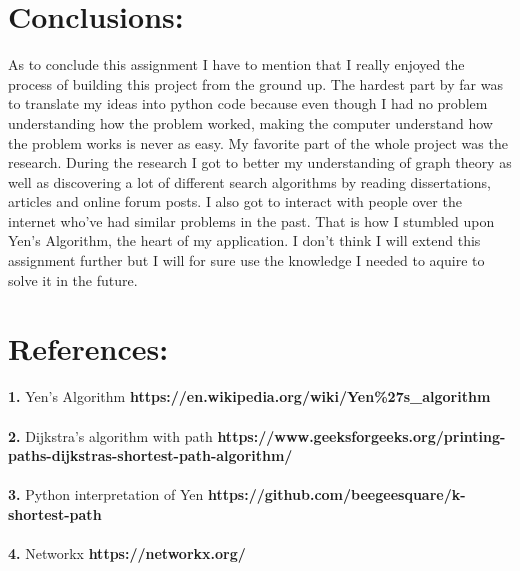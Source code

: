 \documentclass[12pt]{article}
\begin{document}
\section{Conclusions:}
As to conclude this assignment I have to mention that I really enjoyed the process of building this project from the ground up. The hardest part by far was to translate my ideas into python code because even though I had no problem understanding how the problem worked, making the computer understand how the problem works is never as easy.\newline
My favorite part of the whole project was the research. During the research I got to better my understanding of graph theory as well as discovering a lot of different search algorithms by reading dissertations, articles and online forum posts. I also got to interact with people over the internet who've had similar problems in the past. That is how I stumbled upon Yen's Algorithm, the heart of my application. I don't think I will extend this assignment further but I will for sure use the knowledge I needed to aquire to solve it in the future.
\section{References:}

    \caption{
    \textbf{1.} Yen's Algorithm \textbf{https://en.wikipedia.org/wiki/Yen\%27s\_algorithm}\\\\
    \textbf{2.} Dijkstra's algorithm with path \textbf{https://www.geeksforgeeks.org/printing-paths-dijkstras-shortest-path-algorithm/}\\\\
    \textbf{3.} Python interpretation of Yen \textbf{https://github.com/beegeesquare/k-shortest-path}\\\\
    \textbf{4.} Networkx \textbf{https://networkx.org/}\\\\
    }
\end{document}
